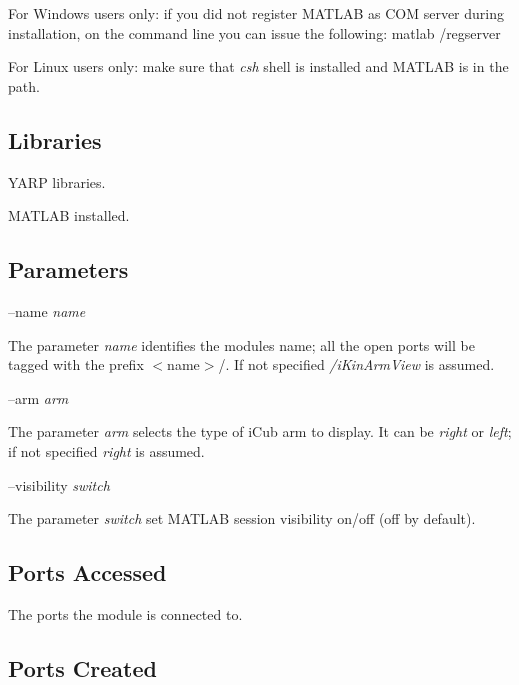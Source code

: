 For Windows users only\+: if you did not register M\+A\+T\+L\+A\+B as C\+O\+M server during installation, on the command line you can issue the following\+: matlab /regserver

For Linux users only\+: make sure that {\itshape csh} shell is installed and M\+A\+T\+L\+A\+B is in the path.\hypertarget{group__icub__tld_lib_sec}{}\subsection{Libraries}\label{group__icub__tld_lib_sec}

\begin{DoxyItemize}
\item Y\+A\+R\+P libraries.
\item M\+A\+T\+L\+A\+B installed.
\end{DoxyItemize}\hypertarget{group__icub__tld_parameters_sec}{}\subsection{Parameters}\label{group__icub__tld_parameters_sec}
--name {\itshape name} 
\begin{DoxyItemize}
\item The parameter {\itshape name} identifies the module\textquotesingle{}s name; all the open ports will be tagged with the prefix $<$name$>$/. If not specified {\itshape /i\+Kin\+Arm\+View} is assumed.
\end{DoxyItemize}

--arm {\itshape arm} 
\begin{DoxyItemize}
\item The parameter {\itshape arm} selects the type of i\+Cub arm to display. It can be {\itshape right} or {\itshape left}; if not specified {\itshape right} is assumed.
\end{DoxyItemize}

--visibility {\itshape switch} 
\begin{DoxyItemize}
\item The parameter {\itshape switch} set M\+A\+T\+L\+A\+B session visibility on/off (off by default).
\end{DoxyItemize}\hypertarget{group__icub__signalScope_portsa_sec}{}\subsection{Ports Accessed}\label{group__icub__signalScope_portsa_sec}
The ports the module is connected to.\hypertarget{group__icub__tld_portsc_sec}{}\subsection{Ports Created}\label{group__icub__tld_portsc_sec}


